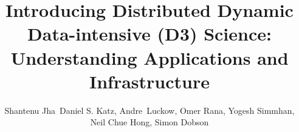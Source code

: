 




\title{Introducing Distributed Dynamic Data-intensive (D3) Science:
  Understanding Applications and Infrastructure}



\author{Shantenu Jha\corrauth\, Daniel S. Katz,
  Andre~Luckow, Omer Rana, Yogesh Simmhan, Neil Chue
  Hong, Simon Dobson}



\address{Rutgers University\break
{}University of Chicago \& Argonne National Laboratory\break
{}Cardiff University\break
{}Indian Institute of Science\break
{}University of Edinburgh\break
{}University of St.~Andrews\break
}





